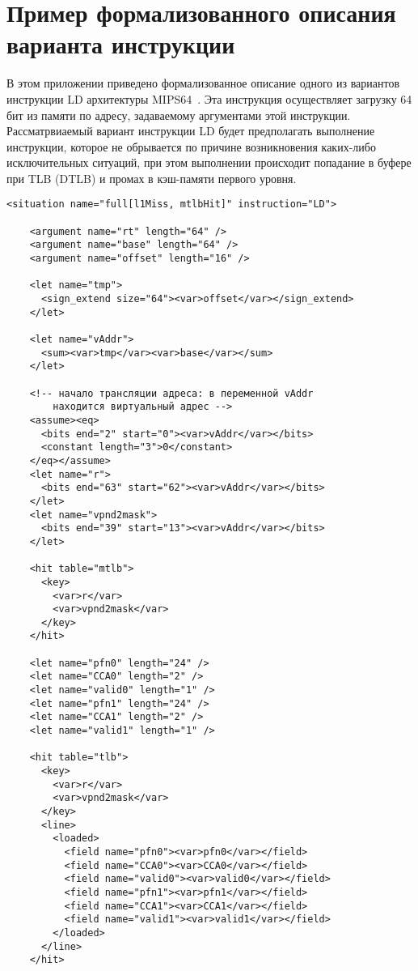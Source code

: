 \chapter{Пример формализованного описания варианта инструкции}\label{sec:xml}

В этом приложении приведено формализованное описание одного из вариантов инструкции LD архитектуры MIPS64~\cite{mips64II}. Эта инструкция осуществляет загрузку 64 бит из памяти по адресу, задаваемому аргументами этой инструкции. Рассматрвиаемый вариант инструкции LD будет предполагать выполнение инструкции, которое не обрывается по причине возникновения каких-либо исключительных ситуаций, при этом выполнении происходит попадание в буфере при TLB (DTLB) и промах в кэш-памяти первого уровня.

\begin{verbatim}
<situation name="full[l1Miss, mtlbHit]" instruction="LD">

    <argument name="rt" length="64" />
    <argument name="base" length="64" />
    <argument name="offset" length="16" />

    <let name="tmp">
      <sign_extend size="64"><var>offset</var></sign_extend>
    </let>

    <let name="vAddr">
      <sum><var>tmp</var><var>base</var></sum>
    </let>

    <!-- начало трансляции адреса: в переменной vAddr
        находится виртуальный адрес -->
    <assume><eq>
      <bits end="2" start="0"><var>vAddr</var></bits>
      <constant length="3">0</constant>
    </eq></assume>
    <let name="r">
      <bits end="63" start="62"><var>vAddr</var></bits>
    </let>
    <let name="vpnd2mask">
      <bits end="39" start="13"><var>vAddr</var></bits>
    </let>

    <hit table="mtlb">
      <key>
        <var>r</var>
        <var>vpnd2mask</var>
      </key>
    </hit>

    <let name="pfn0" length="24" />
    <let name="CCA0" length="2" />
    <let name="valid0" length="1" />
    <let name="pfn1" length="24" />
    <let name="CCA1" length="2" />
    <let name="valid1" length="1" />

    <hit table="tlb">
      <key>
        <var>r</var>
        <var>vpnd2mask</var>
      </key>
      <line>
        <loaded>
          <field name="pfn0"><var>pfn0</var></field>
          <field name="CCA0"><var>CCA0</var></field>
          <field name="valid0"><var>valid0</var></field>
          <field name="pfn1"><var>pfn1</var></field>
          <field name="CCA1"><var>CCA1</var></field>
          <field name="valid1"><var>valid1</var></field>
        </loaded>
      </line>
    </hit>


\end{verbatim}
